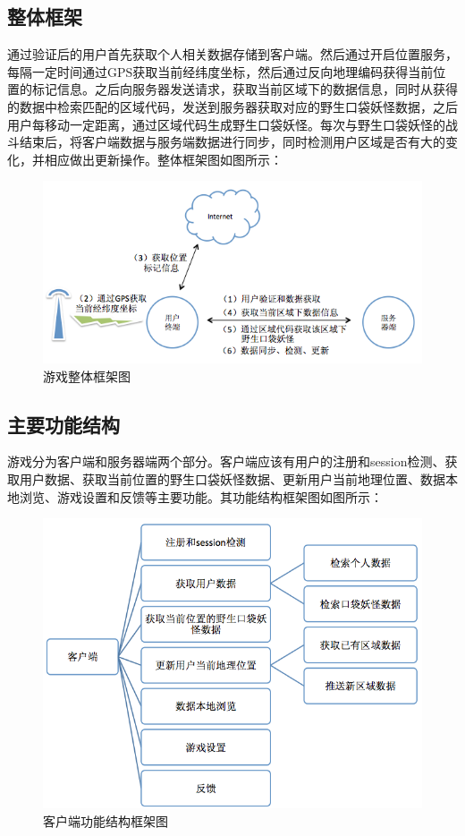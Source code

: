 \documentclass{article}
\begin{document}
\begin{CJK}{UTF8}{gbsn}
	\subsection{整体框架}
  通过验证后的用户首先获取个人相关数据存储到客户端。然后通过开启位置服务，每隔一定时间通过GPS获取当前经纬度坐标，然后通过反向地理编码获得当前位置的标记信息。之后向服务器发送请求，获取当前区域下的数据信息，同时从获得的数据中检索匹配的区域代码，发送到服务器获取对应的野生口袋妖怪数据，之后用户每移动一定距离，通过区域代码生成野生口袋妖怪。每次与野生口袋妖怪的战斗结束后，将客户端数据与服务端数据进行同步，同时检测用户区域是否有大的变化，并相应做出更新操作。整体框架图如图所示：

  \begin{figure}[htbp]
		\centering
		\includegraphics[bb=0 0 582 280, scale=0.45]{figure/fig_n04.png}
		\caption{游戏整体框架图}
		\label{fig:n04}
	\end{figure}

	\subsection{主要功能结构}
  游戏分为客户端和服务器端两个部分。客户端应该有用户的注册和session检测、获取用户数据、获取当前位置的野生口袋妖怪数据、更新用户当前地理位置、数据本地浏览、游戏设置和反馈等主要功能。其功能结构框架图如图所示：

  \begin{figure}[htbp]
		\centering
		\includegraphics[bb=0 0 651 500, scale=0.45]{figure/fig_n05.png}
		\caption{客户端功能结构框架图}
		\label{fig:n05}
	\end{figure}


\end{CJK}
\end{document}
